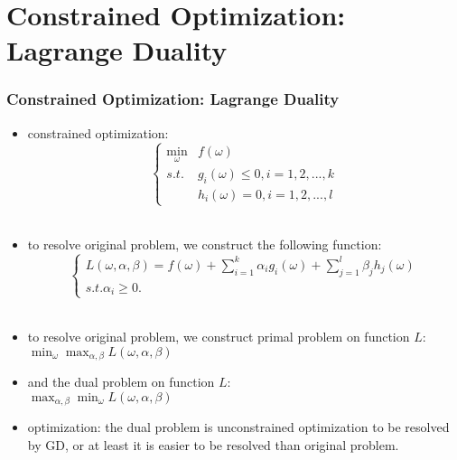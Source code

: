 
\ifx\allfiles\undefined

\fi
\section{Constrained Optimization: Lagrange Duality}
\begin{frame}
\frametitle{Constrained Optimization: Lagrange Duality}
	\small
	\begin{itemize}
		\item constrained optimization:
			\scriptsize
			\begin{equation*}
				\left\{
					\begin{aligned}
						\min_\omega &f(\omega)\\	
						s.t. &g_i(\omega) \leq 0, i=1,2,...,k\\
						&h_i(\omega)=0,i=1,2,...,l
					\end{aligned}
				\right.
			\end{equation*}\\
		\item to resolve original problem, we construct the following function: 
			\scriptsize
			\begin{equation*}
				\left\{
					\begin{aligned}
						L(\omega,\alpha,\beta)=f(\omega)
							+\sum_{i=1}^{k}\alpha_ig_i(\omega)
							+\sum_{j=1}^{l}\beta_jh_j(\omega)\\
						s.t. \alpha_i \geq 0.
					\end{aligned}
				\right.
			\end{equation*}\\
		\item to resolve original problem, we construct primal problem on function $L$:\\
			$\min_{\omega}\max_{\alpha,\beta}L(\omega,\alpha,\beta)$
		\item and the dual problem on function $L$:\\
			$\max_{\alpha,\beta}\min_{\omega}L(\omega,\alpha,\beta)$
		\item optimization: the dual problem is unconstrained optimization to be resolved by GD, or at least it is easier to be resolved than original problem.
	\end{itemize}
\end{frame}
